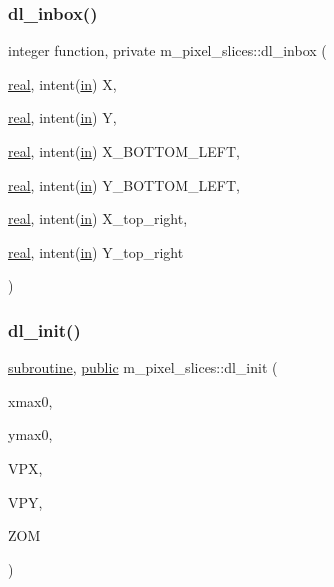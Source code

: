 \subsubsection{\texorpdfstring{dl\+\_\+inbox()}{dl\_inbox()}}
{\footnotesize\ttfamily integer function, private m\+\_\+pixel\+\_\+slices\+::dl\+\_\+inbox (\begin{DoxyParamCaption}\item[{\hyperlink{read__watch_83_8txt_abdb62bde002f38ef75f810d3a905a823}{real}, intent(\hyperlink{M__journal_83_8txt_afce72651d1eed785a2132bee863b2f38}{in})}]{X,  }\item[{\hyperlink{read__watch_83_8txt_abdb62bde002f38ef75f810d3a905a823}{real}, intent(\hyperlink{M__journal_83_8txt_afce72651d1eed785a2132bee863b2f38}{in})}]{Y,  }\item[{\hyperlink{read__watch_83_8txt_abdb62bde002f38ef75f810d3a905a823}{real}, intent(\hyperlink{M__journal_83_8txt_afce72651d1eed785a2132bee863b2f38}{in})}]{X\+\_\+\+B\+O\+T\+T\+O\+M\+\_\+\+L\+E\+FT,  }\item[{\hyperlink{read__watch_83_8txt_abdb62bde002f38ef75f810d3a905a823}{real}, intent(\hyperlink{M__journal_83_8txt_afce72651d1eed785a2132bee863b2f38}{in})}]{Y\+\_\+\+B\+O\+T\+T\+O\+M\+\_\+\+L\+E\+FT,  }\item[{\hyperlink{read__watch_83_8txt_abdb62bde002f38ef75f810d3a905a823}{real}, intent(\hyperlink{M__journal_83_8txt_afce72651d1eed785a2132bee863b2f38}{in})}]{X\+\_\+top\+\_\+right,  }\item[{\hyperlink{read__watch_83_8txt_abdb62bde002f38ef75f810d3a905a823}{real}, intent(\hyperlink{M__journal_83_8txt_afce72651d1eed785a2132bee863b2f38}{in})}]{Y\+\_\+top\+\_\+right }\end{DoxyParamCaption})\hspace{0.3cm}{\ttfamily [private]}}

\mbox{\label{namespacem__pixel__slices_a4ac8bc6e1f869e60a675611420fee0f7}} 
\subsubsection{\texorpdfstring{dl\+\_\+init()}{dl\_init()}}
{\footnotesize\ttfamily \hyperlink{M__stopwatch_83_8txt_acfbcff50169d691ff02d4a123ed70482}{subroutine}, \hyperlink{M__stopwatch_83_8txt_a2f74811300c361e53b430611a7d1769f}{public} m\+\_\+pixel\+\_\+slices\+::dl\+\_\+init (\begin{DoxyParamCaption}\item[{}]{xmax0,  }\item[{}]{ymax0,  }\item[{}]{V\+PX,  }\item[{}]{V\+PY,  }\item[{}]{Z\+OM }\end{DoxyParamCaption})}




